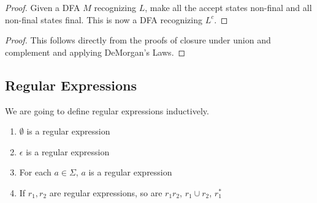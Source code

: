 
\begin{proof}
	Given a DFA $M$ recognizing $L$, make all the accept states non-final and all non-final states final.  This is now a DFA recognizing $L^c$.
\end{proof}



\begin{proof}
	This follows directly from the proofs of closure under union and complement and applying DeMorgan's Laws.
	
\end{proof}




\subsection*{Regular Expressions}



We are going to define regular expressions inductively.

\begin{enumerate}
	\item[] $\emptyset$ is a regular expression
	\item[] $\epsilon$ is a regular expression
	\item[] For each $a\in\Sigma$, $a$ is a regular expression
	\item[] If $r_1,r_2$ are regular expressions, so are $r_1 r_2$, $r_1\cup r_2$, $r_1^*$
	
\end{enumerate}



